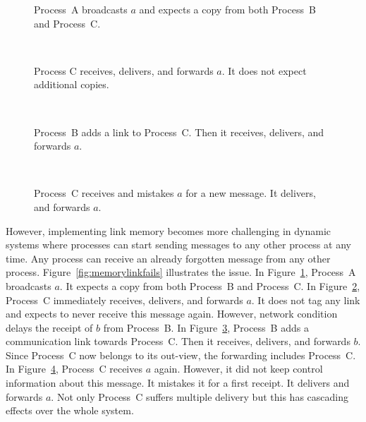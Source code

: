 \begin{figure*}[t]
  \begin{center}
    \begin{subfigure}{0.23\textwidth}
      
      \caption{\label{fig:memorylinkfailsA}Process~A broadcasts $a$ and expects a copy
        from both Process~B and Process~C.}
    \end{subfigure}
    ~
    \begin{subfigure}{0.23\textwidth}
      
      \caption{\label{fig:memorylinkfailsB}Process C receives, delivers, and
        forwards $a$. It does not expect additional copies.}
    \end{subfigure}
    ~
    \begin{subfigure}{0.23\textwidth}
      
      \caption{\label{fig:memorylinkfailsC}Process~B adds a link to Process~C. 
        Then it receives, delivers, and forwards $a$.}
    \end{subfigure}
    ~
    \begin{subfigure}{0.23\textwidth}
      \centering
      \caption{\label{fig:memorylinkfailsD}Process~C receives and mistakes $a$
        for a new message. It delivers, and forwards $a$.}
    \end{subfigure}
    \caption{\label{fig:memorylinkfails}Causal broadcast
      (Algorithm~\ref{algo:reliablebroadcast}) fails to forbid multiple delivery
      in dynamic systems. }
  \end{center}
\end{figure*}




However, implementing link memory becomes more challenging in dynamic
systems where processes can start sending messages to any other process at any
time. Any process can receive an already forgotten message from any other
process. Figure~\ref{fig:memorylinkfails} illustrates the issue. In
Figure~\ref{fig:memorylinkfailsA}, Process~A broadcasts $a$. It expects a copy
from both Process~B and Process~C. In Figure~\ref{fig:memorylinkfailsB},
Process~C immediately receives, delivers, and forwards $a$. It does not tag any
link and expects to never receive this message again. However, network condition
delays the receipt of $b$ from Process~B. In Figure~\ref{fig:memorylinkfailsC},
Process~B adds a communication link towards Process~C. Then it receives,
delivers, and forwards $b$. Since Process~C now belongs to its out-view, the
forwarding includes Process~C. In Figure~\ref{fig:memorylinkfailsD}, Process~C
receives $a$ again. However, it did not keep control information about this
message. It mistakes it for a first receipt. It delivers and forwards $a$. Not
only Process~C suffers multiple delivery but this has cascading effects over the
whole system.


